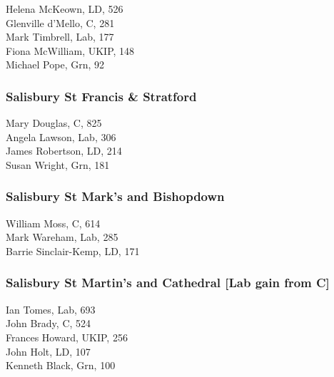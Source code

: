 \documentclass[a4paper,openany,10pt]{book}
\begin{document}


Helena McKeown, LD, 526\\
Glenville d'Mello, C, 281\\
Mark Timbrell, Lab, 177\\
Fiona McWilliam, UKIP, 148\\
Michael Pope, Grn, 92\\


\subsubsection*{Salisbury St Francis \& Stratford}



Mary Douglas, C, 825\\
Angela Lawson, Lab, 306\\
James Robertson, LD, 214\\
Susan Wright, Grn, 181\\


\subsubsection*{Salisbury St Mark's and Bishopdown}



William Moss, C, 614\\
Mark Wareham, Lab, 285\\
Barrie Sinclair-Kemp, LD, 171\\


\subsubsection*{Salisbury St Martin's and Cathedral \hspace*{\fill}\nolinebreak[1]%
\enspace\hspace*{\fill}
[Lab gain from C]}



Ian Tomes, Lab, 693\\
John Brady, C, 524\\
Frances Howard, UKIP, 256\\
John Holt, LD, 107\\
Kenneth Black, Grn, 100\\
\end{document}
